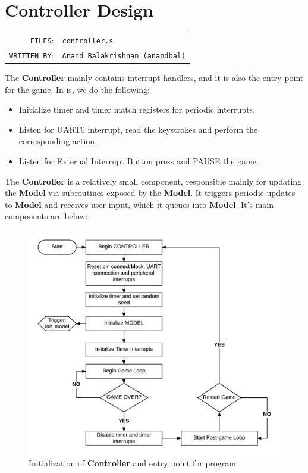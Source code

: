 \section{Controller Design}

  \begin{table}[H]
  \begin{tabular}{rl}
    \texttt{FILES}:         &\texttt{controller.s}  \\
    \texttt{WRITTEN BY}:    &\texttt{Anand Balakrishnan (anandbal)}
  \end{tabular}
  \end{table}


  The \textbf{Controller} mainly contains interrupt handlers, and it is also the entry point for the game.
  In is, we do the following:

  \begin{itemize}
    \item Initialize timer and timer match registers for periodic interrupts.
    \item Listen for UART0 interrupt, read the keystrokes and perform the corresponding action.
    \item Listen for External Interrupt Button press and PAUSE the game.
  \end{itemize}

  The \textbf{Controller} is a relatively small component, responsible mainly for updating the \textbf{Model} via subroutines exposed by the \textbf{Model}. It triggers periodic updates to \textbf{Model} and receives user input, which it queues into \textbf{Model}.
  It's main components are below:

  \begin{figure}[H]
    \centering
    \includegraphics[scale=0.6]{images/controller-base.png}
    \caption{\label{fig:controller-init} Initialization of \textbf{Controller} and entry point for program}
  \end{figure}

